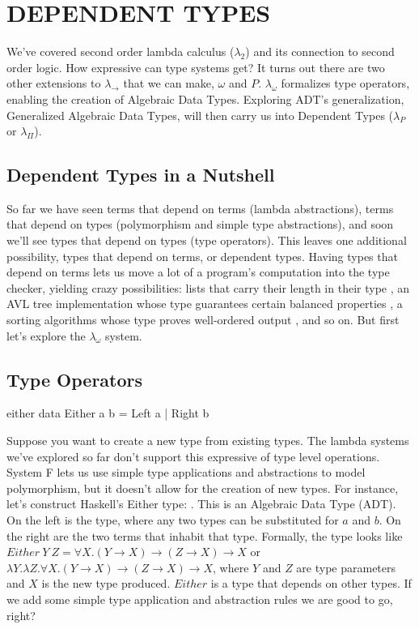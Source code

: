 
\chapter{DEPENDENT TYPES}\label{ch:dependenttypes}
We've covered second order lambda calculus ($\lambda_2$) and its connection to second order logic. How expressive can type systems get? It turns out there are two other extensions to $\lambda_\rightarrow$ that we can make, $\omega $ and $P$. $\lambda_\omega$ formalizes type operators, enabling the creation of Algebraic Data Types. Exploring ADT's generalization, Generalized Algebraic Data Types, will then carry us into Dependent Types ($\lambda_P$ or $\lambda_\Pi$).

\section{Dependent Types in a Nutshell}
So far we have seen terms that depend on terms (lambda abstractions), terms that depend on types (polymorphism and simple type abstractions), and soon we'll see types that depend on types (type operators). This leaves one additional possibility, types that depend on terms, or dependent types. Having types that depend on terms lets us move a lot of a program's computation into the type checker, yielding crazy possibilities: lists that carry their length in their type \cite{vectors}, an AVL tree implementation whose type guarantees certain balanced properties \cite{progOmega}, a sorting algorithms whose type proves well-ordered output \cite{whyDep}, and so on. But first let's explore the $\lambda_\omega $ system.

\section{Type Operators}
\begin{SaveVerbatim}{either}
data Either a b = Left a | Right b
\end{SaveVerbatim}
Suppose you want to create a new type from existing types. The lambda systems we've explored so far don't support this expressive of type level operations. System F lets us use simple type applications and abstractions to model polymorphism, but it doesn't allow for the creation of new types.
For instance, let's construct Haskell's Either type: . This is an Algebraic Data Type (ADT). On the left is the type, where any two types can be substituted for $a$ and $b$. On the right are the two terms that inhabit that type. Formally, the type looks like $Either\ Y\ Z = \forall X. (Y \rightarrow X) \rightarrow (Z \rightarrow X) \rightarrow X $ or $\lambda Y. \lambda Z. \forall X. (Y \rightarrow X) \rightarrow (Z \rightarrow X) \rightarrow X $, where $Y$ and $Z$ are type parameters and $X$ is the new type produced. $Either$ is a type that depends on other types. If we add some simple type application and abstraction rules we are good to go, right?

